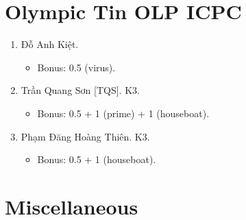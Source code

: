 \documentclass{article}
\begin{document}

\section{Olympic Tin OLP ICPC}

\begin{enumerate}
	\item {\sc Đỗ Anh Kiệt.}
	\begin{itemize}
		\item Bonus: 0.5 (virus).
	\end{itemize}
	\item {\sc Trần Quang Sơn [TQS].} K3.
	\begin{itemize}
		\item Bonus: 0.5 + 1 (prime) + 1 (houseboat).
	\end{itemize}
	\item {\sc Phạm Đăng Hoàng Thiên.} K3.
		\begin{itemize}
		\item Bonus: 0.5 + 1 (houseboat).
	\end{itemize}
\end{enumerate}


\section{Miscellaneous}


\printbibliography[heading=bibintoc]
	
\end{document}
